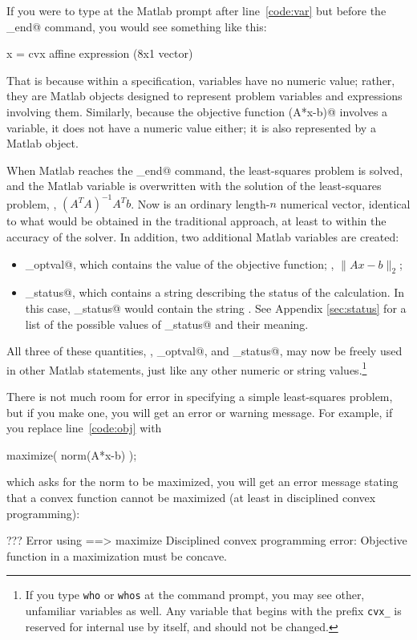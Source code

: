 \documentclass[12pt]{article}
\begin{document}
If you were to type \verb@x@ at the
Matlab prompt after line~\ref{code:var} but
before the \verb@cvx_end@ command, you would see something
like this:
\begin{code}
	x =
	    cvx affine expression (8x1 vector)
\end{code}
That is because within a specification, variables have no
numeric value; rather, they are Matlab objects 
designed to represent problem variables and expressions
involving them. Similarly, 
because the objective function \verb@norm(A*x-b)@ 
involves a \cvx variable, it does not have a numeric value either; 
it is also represented by a Matlab object.

When Matlab reaches the \verb@cvx_end@ command, the least-squares
problem is solved,
and the Matlab variable \verb@x@ is overwritten
with the solution of the least-squares problem, \ie, $(A^TA)^{-1}A^Tb$.
Now \verb@x@ is an ordinary length-$n$ numerical vector, identical
to what would be obtained in the traditional approach, at least to
within the accuracy of the solver. In addition, two additional Matlab
variables are created:
\begin{itemize}
\item \verb@cvx_optval@, which contains the value of the objective
function; \ie, $\|Ax-b\|_2$;
\item \verb@cvx_status@, which contains a string describing the
status of the calculation. In this case, \verb@cvx_status@
would contain the string \verb@Solved@. See Appendix \ref{sec:status}
for a list of the possible values of \verb@cvx_status@ and their meaning.
\end{itemize}
All three of these quantities, \verb@x@, \verb@cvx_optval@, and
\verb@cvx_status@, may now be freely used in other Matlab
statements, just like any other numeric or string values.\footnote{If you type
\texttt{who} or \texttt{whos} at the command prompt, you may see other, unfamiliar
variables as well. Any variable that begins with the prefix \texttt{cvx\_} is 
reserved for internal use by \cvx itself, and should not be changed.}

There is not much room for error in specifying a simple least-squares
problem, but if you make one, you will get an error or warning message.
For example, if you replace line~\ref{code:obj} with
\begin{code}
	maximize( norm(A*x-b) );
\end{code}
which asks for the norm to be maximized, you will get an error message
stating that a convex function cannot be maximized (at least in
disciplined convex programming):
\begin{code}
??? Error using ==> maximize
Disciplined convex programming error:
Objective function in a maximization must be concave.
\end{code}
\end{document}
